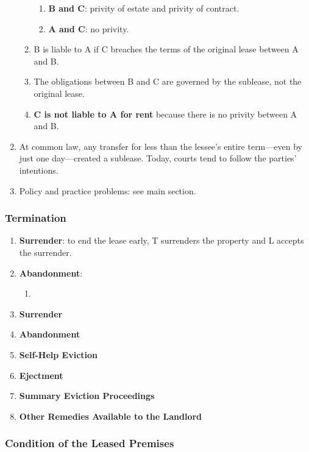 \begin{enumerate}
\begin{enumerate}
\begin{enumerate}
            \item \textbf{B and C}: privity of estate and privity of contract.
            \item \textbf{A and C}: no privity.
        \end{enumerate}
        \item B is liable to A if C breaches the terms of the original lease 
        between A and B.
        \item The obligations between B and C are governed by the sublease, 
        not the original lease.
        \item \textbf{C is not liable to A for rent} because there is no 
        privity between A and B.
    \end{enumerate}
    \item At common law, any transfer for less than the lessee's entire 
    term---even by just one day---created a sublease. Today, courts tend to 
    follow the parties' intentions.
    \item Policy and practice problems: see main section.
\end{enumerate}

\subsubsection{Termination} %

\begin{enumerate}
    \item \textbf{Surrender}: to end the lease early, T surrenders the 
    property and L accepts the surrender.
    \item \textbf{Abandonment}:
    \begin{enumerate}
        \item %
    \end{enumerate}
    \item \textbf{Surrender} %
    \item \textbf{Abandonment} %
    \item \textbf{Self-Help Eviction} %
    \item \textbf{Ejectment} %
    \item \textbf{Summary Eviction Proceedings} %
    \item \textbf{Other Remedies Available to the Landlord} %
\end{enumerate}

\subsubsection{Condition of the Leased Premises} %

